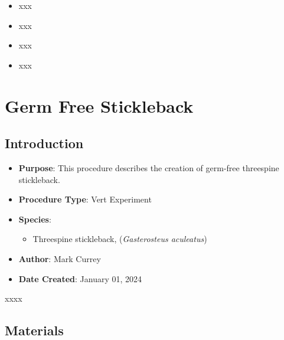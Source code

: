 \documentclass[
  letterpaper,
  DIV=11,
  numbers=noendperiod]{scrreprt}
\providecommand{\tightlist}{%
  \setlength{\itemsep}{0pt}\setlength{\parskip}{0pt}}\usepackage{longtable,booktabs,array}
\begin{document}
\begin{itemize}
\tightlist
\item
  xxx
\item
  xxx
\item
  xxx
\item
  xxx
\end{itemize}

\hypertarget{sec-vert_exp_gremfree_SB}{%
\chapter{Germ Free Stickleback}\label{sec-vert_exp_gremfree_SB}}

\hypertarget{introduction-52}{%
\section{Introduction}\label{introduction-52}}

\begin{itemize}
\tightlist
\item
  \textbf{Purpose}: This procedure describes the creation of germ-free
  threespine stickleback.
\item
  \textbf{Procedure Type}: Vert Experiment
\item
  \textbf{Species}:

  \begin{itemize}
  \tightlist
  \item
    Threespine stickleback, (\emph{Gasterosteus aculeatus})
  \end{itemize}
\item
  \textbf{Author}: Mark Currey
\item
  \textbf{Date Created}: January 01, 2024
\end{itemize}

\begin{tcolorbox}[enhanced jigsaw, bottomtitle=1mm, rightrule=.15mm, toptitle=1mm, opacitybacktitle=0.6, bottomrule=.15mm, titlerule=0mm, coltitle=black, leftrule=.75mm, arc=.35mm, colback=white, colframe=quarto-callout-warning-color-frame, left=2mm, colbacktitle=quarto-callout-warning-color!10!white, title=\textcolor{quarto-callout-warning-color}{\faExclamationTriangle}\hspace{0.5em}{NOTES}, toprule=.15mm, opacityback=0, breakable]

xxxx

\end{tcolorbox}

\hypertarget{materials-48}{%
\section{Materials}\label{materials-48}}
\end{document}
